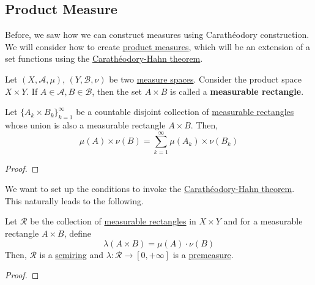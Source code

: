 \subsection{Product Measure} 

  Before, we saw how we can construct measures using Carathéodory construction. We will consider how to create \hyperref[def:product-measure]{product measures}, which will be an extension of a set functions using the \hyperref[thm:caratheodory-hahn-theorem]{Carathéodory-Hahn theorem}. 

  \begin{definition}
    \label{def:measurable-rectangle}
    Let $(X, \mathcal{A}, \mu)$, $(Y, \mathcal{B}, \nu)$ be two \hyperref[def:measure-space]{measure spaces}. Consider the product space $X \times Y$. If $A \in \mathcal{A}, B \in \mathcal{B}$, then the set $A \times B$ is called a \textbf{measurable rectangle}. 
  \end{definition}

  \begin{lemma}
    \label{thm:countable-additivity-over-measurable-rectangles}
 
    Let $\{A_k \times B_k\}_{k=1}^\infty$ be a countable disjoint collection of \hyperref[def:measurable-rectangle]{measurable rectangles} whose union is also a measurable rectangle $A \times B$. Then, 
    \begin{equation}
      \mu(A) \times \nu(B) = \sum_{k=1}^\infty \mu(A_k) \times \nu(B_k)
    \end{equation}
  \end{lemma}
  \begin{proof}
    
  \end{proof}

  We want to set up the conditions to invoke the \hyperref[thm:caratheodory-hahn-theorem]{Carathéodory-Hahn theorem}. This naturally leads to the following. 

  \begin{theorem}
    \label{thm:measurable-rectangles-form-a-semialgebra}
    Let $\mathcal{R}$ be the collection of \hyperref[def:measurable-rectangle]{measurable rectangles} in $X \times Y$ and for a measurable rectangle $A \times B$, define 
    \begin{equation}
      \lambda(A \times B) = \mu(A) \cdot \nu(B)
    \end{equation}
    Then, $\mathcal{R}$ is a \hyperref[def:semiring]{semiring} and $\lambda: \mathcal{R} \to [0, +\infty]$ is a \hyperref[def:premeasure]{premeasure}. 
  \end{theorem}
  \begin{proof}
    
  \end{proof}

